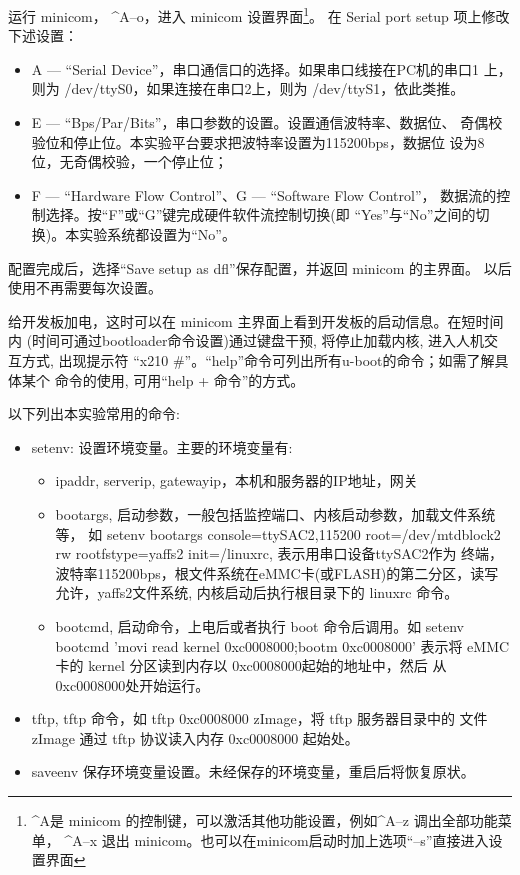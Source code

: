     运行 minicom， \^{}A--o，进入 minicom 设置界面\footnote{\^{}A是
minicom 的控制键，可以激活其他功能设置，例如\^{}A--z 调出全部功能菜单，
\^{}A--x 退出 minicom。也可以在minicom启动时加上选项``--s''直接进入设置界面}。
在 Serial port setup 项上修改下述设置：
\begin{itemize}\itemsep=-3pt
  \item A --- ``Serial Device''，串口通信口的选择。如果串口线接在PC机的串口1
		上，则为 /dev/ttyS0，如果连接在串口2上，则为 /dev/ttyS1，依此类推。
  \item E --- ``Bps/Par/Bits''，串口参数的设置。设置通信波特率、数据位、
		奇偶校验位和停止位。本实验平台要求把波特率设置为115200bps，数据位
		设为8位，无奇偶校验，一个停止位；
  \item F --- ``Hardware Flow Control''、G --- ``Software Flow Control''，
		数据流的控制选择。按``F''或``G''键完成硬件软件流控制切换(即
		``Yes''与``No''之间的切换)。本实验系统都设置为``No''。
\end{itemize}

	配置完成后，选择``Save setup as dfl''保存配置，并返回 minicom 的主界面。
以后使用不再需要每次设置。

	给开发板加电，这时可以在 minicom 主界面上看到开发板的启动信息。在短时间内
(时间可通过bootloader命令设置)通过键盘干预, 将停止加载内核, 进入人机交互方式,
出现提示符 ``x210 \#''。``help''命令可列出所有u-boot的命令；如需了解具体某个
命令的使用, 可用``help + 命令''的方式。

	以下列出本实验常用的命令:
\begin{itemize}
  \item setenv: 设置环境变量。主要的环境变量有:
  \begin{itemize}
    \item ipaddr, serverip, gatewayip，本机和服务器的IP地址，网关
    \item bootargs, 启动参数，一般包括监控端口、内核启动参数，加载文件系统等，
		如 setenv bootargs console=ttySAC2,115200 root=/dev/mtdblock2 rw
             rootfstype=yaffs2 init=/linuxrc, 表示用串口设备ttySAC2作为
		终端，波特率115200bps，根文件系统在eMMC卡(或FLASH)的第二分区，读写
		允许，yaffs2文件系统, 内核启动后执行根目录下的 linuxrc 命令。
	\item bootcmd, 启动命令，上电后或者执行 boot 命令后调用。如
		setenv bootcmd 'movi read kernel 0xc0008000;bootm 0xc0008000'
		表示将 eMMC 卡的 kernel 分区读到内存以 0xc0008000起始的地址中，然后
		从0xc0008000处开始运行。
  \end{itemize}
  \item tftp, tftp 命令，如 tftp 0xc0008000 zImage，将 tftp 服务器目录中的
        文件 zImage 通过 tftp 协议读入内存 0xc0008000 起始处。
  \item saveenv 保存环境变量设置。未经保存的环境变量，重启后将恢复原状。
\end{itemize}


